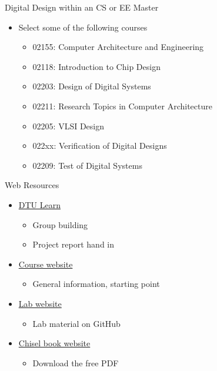 \begin{frame}[fragile]{Digital Design within an CS or EE Master}
\begin{itemize}
\item Select some of the following courses
\begin{itemize}
\item 02155: Computer Architecture and Engineering
\item 02118: Introduction to Chip Design
\item 02203: Design of Digital Systems
\item 02211: Research Topics in Computer Architecture
\item 02205: VLSI Design
\item 022xx: Verification of Digital Designs
\item 02209: Test of Digital Systems
\end{itemize}
\end{itemize}
\end{frame}



\begin{frame}[fragile]{Web Resources}
\begin{itemize}
\item \href{https://learn.inside.dtu.dk/d2l/home}{DTU Learn}
\begin{itemize}
\item Group building
\item Project report hand in
\end{itemize}
\item \href{http://www2.imm.dtu.dk/courses/02139/}{Course website}
\begin{itemize}
\item General information, starting point
\end{itemize}
\item \href{https://github.com/schoeberl/chisel-lab}{Lab website}
\begin{itemize}
\item Lab material on GitHub
\end{itemize}
\item \href{http://www.imm.dtu.dk/~masca/chisel-book.html}{Chisel book website}
\begin{itemize}
\item Download the free PDF
\end{itemize}
\end{itemize}
\end{frame}

